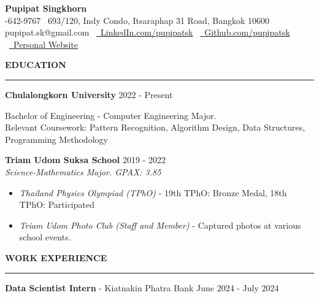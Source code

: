 \documentclass[11pt]{article}
\begin{document}
\begin{center}
    {\Large \textbf{Pupipat Singkhorn}} \\
    -642-9767 \textbullet \ 693/120, Indy Condo, Itsaraphap 31 Road, Bangkok 10600 \\
    pupipat.sk@gmail.com
    \textbullet\ \href{www.linkedin.com/in/pupipatsk}{\faLinkedin\ LinkedIn.com/pupipatsk}
    \textbullet\ \href{https://github.com/pupipatsk}{\faGithub\ Github.com/pupipatsk}
    \textbullet\ \href{https://pupipatsk.github.io/Resume/}{\faGlobe\ Personal Website}
\end{center}
\textbf{EDUCATION}
\vspace{5pt}
{\color{NavyBlue}\hrule}
\vspace{6pt}

\textbf{Chulalongkorn University} \hfill 2022 - Present

\hspace*{7pt} Bachelor of Engineering - Computer Engineering Major.\\
\hspace*{7pt} Relevant Coursework: Pattern Recognition, Algorithm Design, Data Structures, Programming Methodology

\vspace{2pt}

\textbf{Triam Udom Suksa School} \hfill 2019 - 2022\\
\textit{Science-Mathematics Major. GPAX: 3.85}

\begin{itemize}[noitemsep, topsep=0pt, partopsep=0pt, parsep=0pt]
    \item \textit{Thailand Physics Olympiad (TPhO)} - 19th TPhO: Bronze Medal, 18th TPhO: Participated
    \item \textit{Triam Udom Photo Club (Staff and Member)} - Captured photos at various school events.
\end{itemize}

\vspace{9pt}
\textbf{WORK EXPERIENCE}
\vspace{5pt}
{\color{NavyBlue}\hrule}
\vspace{6pt}

\textbf{Data Scientist Intern} - Kiatnakin Phatra Bank \hfill June 2024 - July 2024
\end{document}
